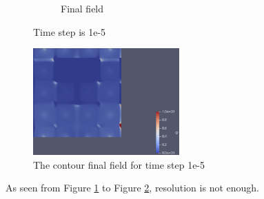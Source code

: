\documentclass{article}
\begin{document}
\begin{figure}[hbt!]
\begin{subfigure}{0.4\textwidth}
        \caption{Final field}
  \end{subfigure}
  \caption{Time step is 1e-5}
  \label{t3m2_1} 
\end{figure}

\begin{figure}[hbt!]
    \centering
    \includegraphics[width=0.5\textwidth]{Figures/e-5 40x40/contour.png}
    \caption{The contour final field for time step 1e-5}
    \label{t3m2_2} 
\end{figure}

As seen from Figure \ref{t3m2_1} to Figure \ref{t3m2_2}, resolution is not enough. 

\clearpage
\end{document}
